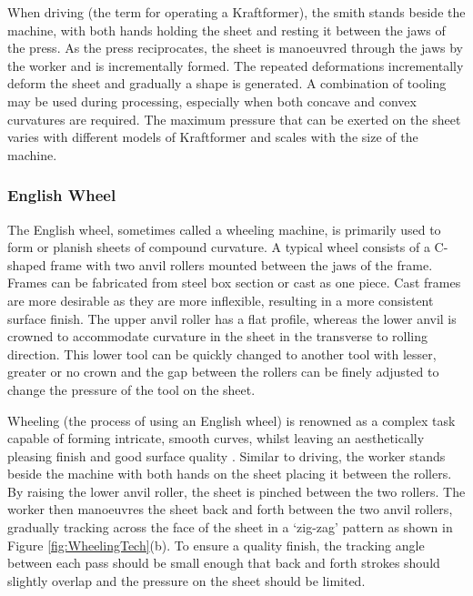When driving (the term for operating a Kraftformer), the smith stands beside the machine, with both hands holding the sheet and resting it between the jaws of the press. As the press reciprocates, the sheet is manoeuvred through the jaws by the worker and is incrementally formed. The repeated deformations incrementally deform the sheet and gradually a shape is generated. A combination of tooling may be used during processing, especially when both concave and convex curvatures are required. The maximum pressure that can be exerted on the sheet varies with different models of Kraftformer and scales with the size of the machine.

\subsubsection{English Wheel} \label{sec:ManualEW}

The English wheel, sometimes called a wheeling machine, is primarily used to form or planish sheets of compound curvature. A typical wheel consists of a C-shaped frame with two anvil rollers mounted between the jaws of the frame. Frames can be fabricated from steel box section or cast as one piece. Cast frames are more desirable as they are more inflexible, resulting in a more consistent surface finish. The upper anvil roller has a flat profile, whereas the lower anvil is crowned to accommodate curvature in the sheet in the transverse to rolling direction. This lower tool can be quickly changed to another tool with lesser, greater or no crown and the gap between the rollers can be finely adjusted to change the pressure of the tool on the sheet. 

Wheeling (the process of using an English wheel) is renowned as a complex task capable of forming intricate, smooth curves, whilst leaving an aesthetically pleasing finish and good surface quality \citep{Longyard2014LearningWheel}. Similar to driving, the worker stands beside the machine with both hands on the sheet placing it between the rollers. By raising the lower anvil roller, the sheet is pinched between the two rollers. The worker then manoeuvres the sheet back and forth between the two anvil rollers, gradually tracking across the face of the sheet in a `zig-zag' pattern as shown in Figure \ref{fig:WheelingTech}(b). To ensure a quality finish, the tracking angle between each pass should be small enough that back and forth strokes should slightly overlap and the pressure on the sheet should be limited.  

